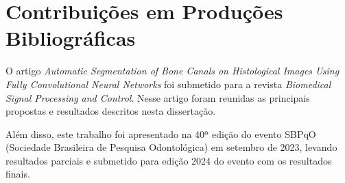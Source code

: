 \section{Contribuições em Produções Bibliográficas}

O artigo \textit{Automatic Segmentation of Bone Canals on Histological Images Using Fully Convolutional Neural Networks}
foi submetido para a revista \textit{Biomedical Signal Processing and Control}. Nesse artigo foram reunidas as principais propostas e resultados descritos nesta dissertação.

Além disso, este trabalho foi apresentado na 40ª edição do evento SBPqO (Sociedade Brasileira de Pesquisa Odontológica) em setembro de 2023, levando resultados parciais e submetido para edição 2024 do evento com os resultados finais.